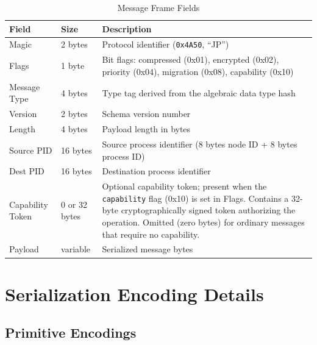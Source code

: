 \documentclass[11pt,a4paper]{article}
\begin{document}
\begin{table}[H]
\centering
\caption{Message Frame Fields}
\begin{tabularx}{\textwidth}{llX}
\toprule
\textbf{Field} & \textbf{Size} & \textbf{Description} \\
\midrule
Magic          & 2 bytes  & Protocol identifier (\texttt{0x4A50}, ``JP'') \\
Flags          & 1 byte   & Bit flags: compressed (0x01), encrypted (0x02),
                             priority (0x04), migration (0x08),
                             capability (0x10) \\
Message Type   & 4 bytes  & Type tag derived from the algebraic data type hash \\
Version        & 2 bytes  & Schema version number \\
Length         & 4 bytes  & Payload length in bytes \\
Source PID     & 16 bytes & Source process identifier (8 bytes node ID + 8 bytes
                             process ID) \\
Dest PID       & 16 bytes & Destination process identifier \\
Capability Token & 0 or 32 bytes & Optional capability token; present when the
                             \texttt{capability} flag (0x10) is set in Flags.
                             Contains a 32-byte cryptographically signed token
                             authorizing the operation. Omitted (zero bytes)
                             for ordinary messages that require no capability. \\
Payload        & variable & Serialized message bytes \\
\bottomrule
\end{tabularx}
\end{table}

\section{Serialization Encoding Details}
\label{app:encoding}

\subsection{Primitive Encodings}
\end{document}
